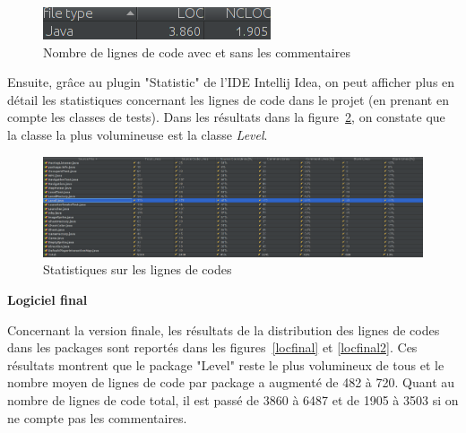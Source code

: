 \documentclass[12pt, openany]{report}
\begin{document}
\begin{figure}[!h]
	\centering
	\includegraphics[scale=0.6]{Images/SizeMetricsLOC2.png} 
	\caption{Nombre de lignes de code avec et sans les commentaires}
	\label{locinit2}
\end{figure}

\newpage
Ensuite, grâce au plugin "Statistic" de l'IDE Intellij Idea, on peut afficher plus en détail les statistiques concernant les lignes de code dans le projet (en prenant en compte les classes de tests). Dans les résultats dans la figure~\ref{locinit3}, on constate que la classe la plus volumineuse est la classe \mbox{\textit{Level}}.

\begin{figure}[!h]
	\centering
	\includegraphics[scale=0.29]{Images/SizeMetricsLOC3.png} 
	\caption{Statistiques sur les lignes de codes}
	\label{locinit3}
\end{figure}



\textbf{Logiciel final}

Concernant la version finale, les résultats de la distribution des lignes de codes dans les packages sont reportés dans les figures~\ref{locfinal} et \ref{locfinal2}. Ces résultats montrent que le package "Level" reste le plus volumineux de tous et le nombre moyen de lignes de code par package a augmenté de 482 à 720. Quant au nombre de lignes de code total, il est passé de 3860 à 6487 et de 1905 à 3503 si on ne compte pas les commentaires.
\end{document}
